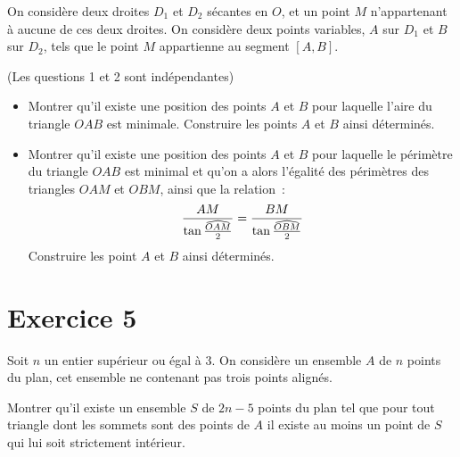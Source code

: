 \documentclass[12pt,a4paper]{article}
\begin{document}
On considère deux droites $D_1$ et $D_2$ sécantes en $O$,
et un point $M$ n'appartenant à aucune de ces deux droites. On
considère deux points variables, $A$ sur $D_1$ et $B$ sur
$D_2$, tels que le point $M$ appartienne au segment $[A,B]$.

\centerline{(Les questions 1 et 2 sont indépendantes)}

\begin{itemize}
\item[(1)] Montrer qu'il existe une position des points $A$ et $ B$ pour
laquelle l'aire du triangle $OAB$ est minimale.
Construire les points $A$ et $B$ ainsi déterminés.
\item[(2)]  Montrer qu'il existe une position des points
$A$ et $B$ pour laquelle le périmètre du triangle $OAB$ est
minimal et qu'on a alors l'égalité des périmètres des
triangles $OAM$ et $OBM$, ainsi que la relation~:
$$\frac {AM}{\tan  {\widehat{OAM}\over 2}} =
\frac {BM}{\tan  {\widehat{OBM}\over 2}}$$ Construire les point $A$ et
$B$ ainsi déterminés.
\end{itemize}

\section*{\color{blue} Exercice 5}

Soit $n$ un entier supérieur ou égal à 3. On
considère un ensemble $A$ de $n$ points du plan, cet ensemble
ne contenant pas trois points alignés.

Montrer qu'il existe un ensemble $S$ de $2n-5$ points du plan
tel que pour tout triangle dont les sommets sont des points de $A$ il
existe au moins un point de $S$ qui lui soit strictement intérieur.
\end{document}
